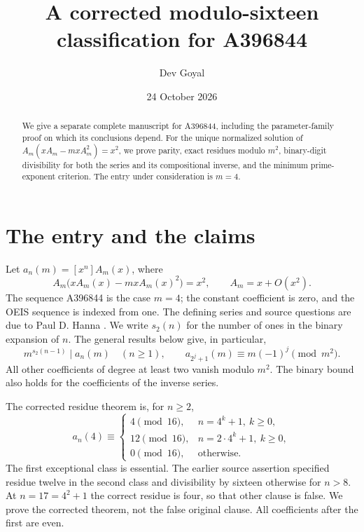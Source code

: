 \documentclass[11pt,a4paper]{article}
\title{A corrected modulo-sixteen classification for A396844}
\author{Dev Goyal}
\date{24 October 2026}
\theoremstyle{remark}\newtheorem{remark}[theorem]{Remark}
\begin{document}
\maketitle
\begin{center}\end{center}

\begin{abstract}
We give a separate complete manuscript for A396844, including the
parameter-family proof on which its conclusions depend. For the unique
normalized solution of $A_m(xA_m-mxA_m^2)=x^2$, we prove parity,
exact residues modulo $m^2$, binary-digit divisibility for both the series
and its compositional inverse, and the minimum prime-exponent criterion.
The entry under consideration is $m=4$.
\end{abstract}
\section{The entry and the claims}
Let $a_n(m)=[x^n]A_m(x)$, where
\begin{equation}\label{eq:general}
 A_m\bigl(xA_m(x)-mxA_m(x)^2\bigr)=x^2,
 \qquad A_m=x+O(x^2).
\end{equation}
The sequence A396844 is the case $m=4$; the constant
coefficient is zero, and the OEIS sequence is indexed from one.
The defining series and source questions are due to Paul D. Hanna
\cite{oeis4}.
We write $s_2(n)$ for the number of ones in the binary expansion of $n$.
The general results below give, in particular,
\[
 m^{s_2(n-1)}\mid a_n(m)\quad(n\ge1),
 \qquad
 a_{2^j+1}(m)\equiv m(-1)^j\pmod{m^2}.
\]
All other coefficients of degree at least two vanish modulo $m^2$.
The binary bound also holds for the coefficients of the inverse series.

The corrected residue theorem is, for $n\ge2$,
\[
a_n(4)\equiv
\begin{cases}
4\pmod{16},&n=4^k+1,\ k\ge0,\\
12\pmod{16},&n=2\cdot4^k+1,\ k\ge0,\\
0\pmod{16},&\text{otherwise}.
\end{cases}
\]
The first exceptional class is essential. The earlier source assertion
specified residue twelve in the second class and divisibility by sixteen
otherwise for $n>8$. At $n=17=4^2+1$ the correct residue is four,
so that other clause is false. We prove the corrected theorem, not the
false original clause. All coefficients after the first are even.
\end{document}
